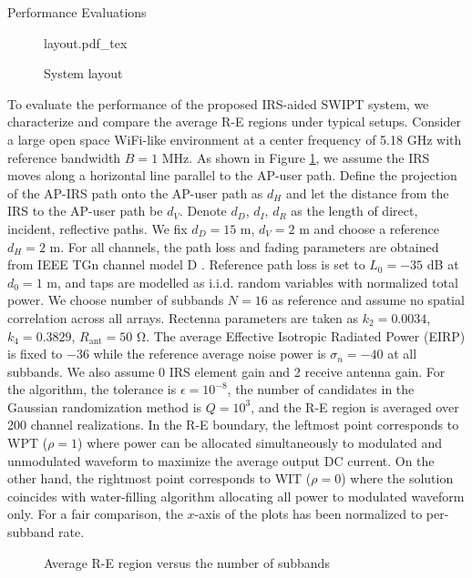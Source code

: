 \documentclass{IEEEtran}
\begin{document}
\begin{section}{Performance Evaluations}
	\begin{figure}
		\centering
		\def\svgwidth{\columnwidth}
		{layout.pdf_tex}
		\caption{System layout}
		\label{fi:layout}
	\end{figure}
	To evaluate the performance of the proposed IRS-aided SWIPT system, we characterize and compare the average R-E regions under typical setups. Consider a large open space WiFi-like environment at a center frequency of 5.18 \si{\GHz} with reference bandwidth $B=1$ \si{\MHz}. As shown in Figure \ref{fi:layout}, we assume the IRS moves along a horizontal line parallel to the AP-user path. Define the projection of the AP-IRS path onto the AP-user path as $d_H$ and let the distance from the IRS to the AP-user path be $d_V$. Denote $d_D$, $d_I$, $d_R$ as the length of direct, incident, reflective paths. We fix $d_D=15$ \si{\meter}, $d_V=2$ \si{\meter} and choose a reference $d_H=2$ \si{\meter}. For all channels, the path loss and fading parameters are obtained from IEEE TGn channel model D \cite{Erceg2004}. Reference path loss is set to $L_0=-35$ \si{\dB} at $d_0=1$ \si{\meter}, and taps are modelled as i.i.d. random variables with normalized total power. We choose number of subbands $N=16$ as reference and assume no spatial correlation across all arrays. Rectenna parameters are taken as $k_2=0.0034$, $k_4=0.3829$, $R_{\text{ant}}=50$ \si{\ohm}. The average Effective Isotropic Radiated Power (EIRP) is fixed to $-36$ \si{\dBi} while the reference average noise power is $\sigma_n=-40$ \si{\dBm} at all subbands. We also assume 0 \si{\dBi} IRS element gain and 2 \si{\dBi} receive antenna gain. For the algorithm, the tolerance is $\epsilon=10^{-8}$, the number of candidates in the Gaussian randomization method is $Q=10^{3}$, and the R-E region is averaged over 200 channel realizations. In the R-E boundary, the leftmost point corresponds to WPT ($\rho=1$) where power can be allocated simultaneously to modulated and unmodulated waveform to maximize the average output DC current. On the other hand, the rightmost point corresponds to WIT ($\rho=0$) where the solution coincides with water-filling algorithm allocating all power to modulated waveform only. For a fair comparison, the $x$-axis of the plots has been normalized to per-subband rate.

	\begin{figure}
		\centering
		\begin{adjustbox}{width=\linewidth}
			
		\end{adjustbox}
		\caption{Average R-E region versus the number of subbands}
		\label{fi:re_subband}
	\end{figure}


\end{section}
\end{document}
